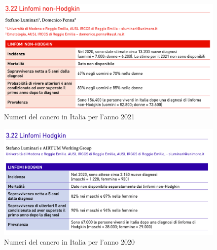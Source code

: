 \begin{figure}[H]
    \begin{center}
    \includegraphics[width=0.8\columnwidth]{img/2021.png}
    \vspace{-3mm}
    \end{center}
    \caption{Numeri del cancro in Italia per l’anno 2021
    \cite{img4-6-7}}
    \label{fig:FIGURE_2.3}
\end{figure}

\begin{figure}[H]
    \begin{center}
    \includegraphics[width=0.8\columnwidth]{img/2020.png}
    \vspace{-3mm}
    \end{center}
    \caption{Numeri del cancro in Italia per l’anno 2020
    \cite{img5}}

\end{figure}

